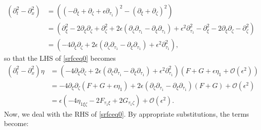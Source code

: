 \documentclass[10pt,reqno,oneside,a4paper]{article}
\begin{document}
\begin{align*}
(\partial_t^2 - \partial_x^2) &= \left( (- \partial_\xi + \partial_\zeta + \epsilon \partial_{\tau_1})^2 - (\partial_\xi + \partial_\zeta)^2 \right) \\
&= \left( \partial^2_\xi - 2\partial_\xi\partial_\zeta + \partial_\zeta^2 + 2\epsilon(\partial_\zeta \partial_{\tau_1} - \partial_\xi\partial_{\tau_1}) + \epsilon^2 \partial_{\tau_1}^2
- \partial_\xi^2 - 2\partial_\xi\partial_\zeta - \partial_\zeta^2 \right) \\
&= \left( - 4\partial_\xi \partial_\zeta + 2\epsilon(\partial_\zeta \partial_{\tau_1} - \partial_\xi\partial_{\tau_1}) + \epsilon^2 \partial_{\tau_1}^2 \right),
\end{align*}
so that the LHS of \eqref{srfceq0} becomes
\begin{align}
(\partial_t^2 - \partial_x^2) \eta
&= \left( - 4\partial_\xi \partial_\zeta + 2\epsilon(\partial_\zeta \partial_{\tau_1} - \partial_\xi\partial_{\tau_1}) + \epsilon^2 \partial_{\tau_1}^2 \right) ( F + G + \epsilon \eta_1 + \mathcal{O}(\epsilon^2)) \nonumber \\
&= - 4\partial_\xi \partial_\zeta  ( F + G + \epsilon \eta_1) + 2\epsilon(\partial_\zeta \partial_{\tau_1} - \partial_\xi\partial_{\tau_1})  ( F + G) + \mathcal{O}(\epsilon^2) \nonumber \\
&=  \epsilon \left(- 4\eta_{1\xi \zeta} - 2F_{\tau_1 \xi} + 2G_{\tau_1 \zeta} \right) + \mathcal{O}(\epsilon^2). \label{LHS1}
\end{align}
Now, we deal with the RHS of \eqref{srfceq0}. By appropriate substitutions, the terms become:
\end{document}
